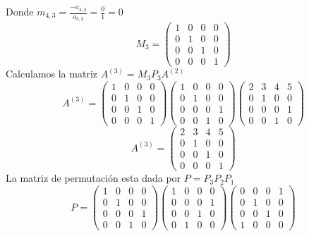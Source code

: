 Donde $m_{4,3} = \frac{-a_{4,3}}{a_{3,3}} = \frac{0}{1} = 0 $ 
\[ M_3 =
    \left( \begin{array}{cccc}
    1 & 0 & 0 & 0\\
    0 & 1 & 0 & 0\\ 
    0 & 0 & 1 & 0\\ 
    0 & 0 & 0 & 1
    \end{array} \right) 
\]
Calculamos la matriz $A^{(3)} = M_{3}P_{3}A^{(2)}$
\[ A^{(3)} =
    \left( \begin{array}{cccc}
    1 & 0 & 0 & 0\\
    0 & 1 & 0 & 0\\ 
    0 & 0 & 1 & 0\\ 
    0 & 0 & 0 & 1
    \end{array} \right) 
    \left( \begin{array}{cccc}
    1 & 0 & 0 & 0\\
    0 & 1 & 0 & 0\\ 
    0 & 0 & 0 & 1\\ 
    0 & 0 & 1 & 0
    \end{array} \right)
    \left( \begin{array}{cccc}
    2 & 3 & 4 & 5\\
    0 & 1 & 0 & 0\\
    0 & 0 & 0 & 1\\
    0 & 0 & 1 & 0
    \end{array} \right)
\]
\[ A^{(3)} =
    \left( \begin{array}{cccc}
    2 & 3 & 4 & 5\\
    0 & 1 & 0 & 0\\
    0 & 0 & 1 & 0\\
    0 & 0 & 0 & 1
    
    \end{array} \right) 
\]
La matriz de permutación esta dada por $P = P_{3}P_{2}P_{1}$
\[ P =
    \left( \begin{array}{cccc}
    1 & 0 & 0 & 0\\
    0 & 1 & 0 & 0\\ 
    0 & 0 & 0 & 1\\ 
    0 & 0 & 1 & 0
    \end{array} \right) 
    \left( \begin{array}{cccc}
    1 & 0 & 0 & 0\\
    0 & 0 & 0 & 1\\ 
    0 & 0 & 1 & 0\\ 
    0 & 1 & 0 & 0
    \end{array} \right)
    \left( \begin{array}{cccc}
    0 & 0 & 0 & 1\\
    0 & 1 & 0 & 0\\ 
    0 & 0 & 1 & 0\\ 
    1 & 0 & 0 & 0
    \end{array} \right)
\]
